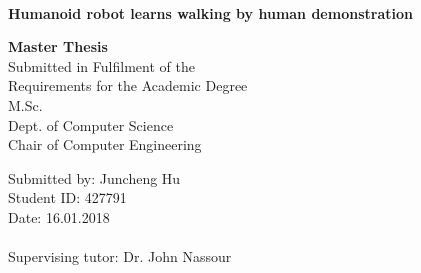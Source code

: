 \documentclass[a4paper, 12pt, oneside, BCOR1cm,toc=chapterentrywithdots]{scrbook}
\begin{document}
%
%

\begin{titlepage}

{
    \begin{center}
        \\
    \end{center}
    \vspace{0.5cm}
}

\begin{center}

\LARGE{\textbf{Humanoid robot learns walking by human demonstration}}\\
\vspace{1cm}


\Large{\textbf{Master Thesis}}\\ 
\vspace{1cm}
Submitted in Fulfilment of the\\
Requirements for the Academic Degree\\
M.Sc.\\
\vspace{0.5cm}
Dept. of Computer Science\\
Chair of Computer Engineering
\end{center}
\vspace{2cm}
Submitted by: Juncheng Hu\\
Student ID: 427791\\
Date: 16.01.2018\\
\vspace{0.3cm}\\
Supervising tutor: Dr. John Nassour\\

\end{titlepage}
\end{document}
